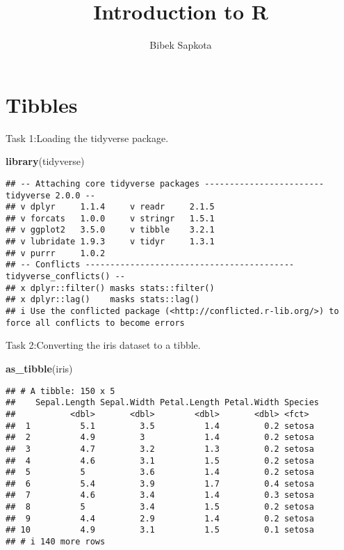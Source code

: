 \documentclass[
]{article}
\title{Introduction to R}
\author{Bibek Sapkota}
\date{}
\newenvironment{Shaded}{\begin{snugshade}}{\end{snugshade}}
\newcommand{\FunctionTok}[1]{\textcolor[rgb]{0.13,0.29,0.53}{\textbf{#1}}}
\newcommand{\NormalTok}[1]{#1}
\begin{document}
\maketitle

\hypertarget{tibbles}{%
\section{Tibbles}\label{tibbles}}

Task 1:Loading the tidyverse package.

\begin{Shaded}
\begin{Highlighting}[]
\FunctionTok{library}\NormalTok{(tidyverse)}
\end{Highlighting}
\end{Shaded}

\begin{verbatim}
## -- Attaching core tidyverse packages ------------------------ tidyverse 2.0.0 --
## v dplyr     1.1.4     v readr     2.1.5
## v forcats   1.0.0     v stringr   1.5.1
## v ggplot2   3.5.0     v tibble    3.2.1
## v lubridate 1.9.3     v tidyr     1.3.1
## v purrr     1.0.2     
## -- Conflicts ------------------------------------------ tidyverse_conflicts() --
## x dplyr::filter() masks stats::filter()
## x dplyr::lag()    masks stats::lag()
## i Use the conflicted package (<http://conflicted.r-lib.org/>) to force all conflicts to become errors
\end{verbatim}

Task 2:Converting the iris dataset to a tibble.

\begin{Shaded}
\begin{Highlighting}[]
\FunctionTok{as\_tibble}\NormalTok{(iris)}
\end{Highlighting}
\end{Shaded}

\begin{verbatim}
## # A tibble: 150 x 5
##    Sepal.Length Sepal.Width Petal.Length Petal.Width Species
##           <dbl>       <dbl>        <dbl>       <dbl> <fct>  
##  1          5.1         3.5          1.4         0.2 setosa 
##  2          4.9         3            1.4         0.2 setosa 
##  3          4.7         3.2          1.3         0.2 setosa 
##  4          4.6         3.1          1.5         0.2 setosa 
##  5          5           3.6          1.4         0.2 setosa 
##  6          5.4         3.9          1.7         0.4 setosa 
##  7          4.6         3.4          1.4         0.3 setosa 
##  8          5           3.4          1.5         0.2 setosa 
##  9          4.4         2.9          1.4         0.2 setosa 
## 10          4.9         3.1          1.5         0.1 setosa 
## # i 140 more rows
\end{verbatim}
\end{document}
